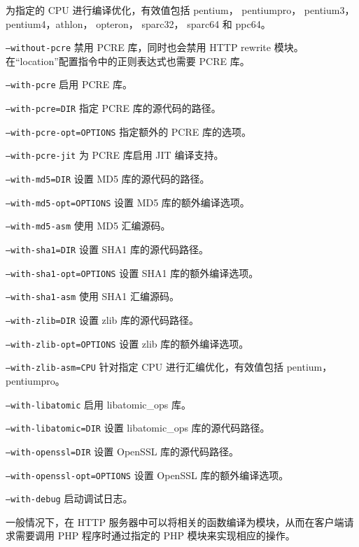\begin{compactitem}
为指定的 CPU 进行编译优化，有效值包括 pentium， pentiumpro， pentium3， pentium4，athlon， opteron， sparc32， sparc64 和 ppc64。
\item \texttt{--without-pcre}
禁用 PCRE 库，同时也会禁用 HTTP rewrite 模块。在“location”配置指令中的正则表达式也需要 PCRE 库。
\item \texttt{--with-pcre}
启用 PCRE 库。
\item \texttt{--with-pcre=DIR}
指定 PCRE 库的源代码的路径。
\item \texttt{--with-pcre-opt=OPTIONS}
指定额外的 PCRE 库的选项。
\item \texttt{--with-pcre-jit}
为 PCRE 库启用 JIT 编译支持。
\item \texttt{--with-md5=DIR}
设置 MD5 库的源代码的路径。
\item \texttt{--with-md5-opt=OPTIONS}
设置 MD5 库的额外编译选项。
\item \texttt{--with-md5-asm}
使用 MD5 汇编源码。
\item \texttt{--with-sha1=DIR}
设置 SHA1 库的源代码路径。
\item \texttt{--with-sha1-opt=OPTIONS}
设置 SHA1 库的额外编译选项。
\item \texttt{--with-sha1-asm}
使用 SHA1 汇编源码。
\item \texttt{--with-zlib=DIR}
设置 zlib 库的源代码路径。
\item \texttt{--with-zlib-opt=OPTIONS}
设置 zlib 库的额外编译选项。
\item \texttt{--with-zlib-asm=CPU}
针对指定 CPU 进行汇编优化，有效值包括 pentium， pentiumpro。
\item \texttt{--with-libatomic}
启用 libatomic\_ops 库。
\item \texttt{--with-libatomic=DIR}
设置 libatomic\_ops 库的源代码路径。
\item \texttt{--with-openssl=DIR}
设置 OpenSSL 库的源代码路径。
\item \texttt{--with-openssl-opt=OPTIONS}
设置 OpenSSL 库的额外编译选项。
\item \texttt{--with-debug}
启动调试日志。
\end{compactitem}





一般情况下，在 HTTP 服务器中可以将相关的函数编译为模块，从而在客户端请求需要调用 PHP 程序时通过指定的 PHP 模块来实现相应的操作。





\begin{lstlisting}[language=bash]

\end{lstlisting}

